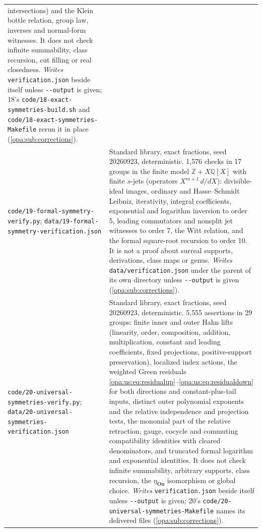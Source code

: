 \documentclass[11pt,oneside]{article}
\numberwithin{equation}{section}
\theoremstyle{definition}
\theoremstyle{remark}
\newcommand{\Q}{\mathbb Q}
\newcommand{\Z}{\mathbb Z}
\newcommand{\fn}[1]{\nolinkurl{#1}}
\newcommand{\On}{\mathbf{On}}
\begin{document}
\begin{center}
\begin{longtable}{>{\raggedright\arraybackslash}p{}>{\raggedright\arraybackslash}p{}}
intersections) and the Klein bottle relation, group law, inverses and normal-form witnesses. It does not check infinite
summability, class recursion, cut filling or real closedness. \emph{Writes} \fn{verification.json} beside itself unless
\fn{--output} is given; 18's \fn{code/18-exact-symmetries-build.sh} and \fn{code/18-exact-symmetries-Makefile} rerun it in place
(\cref{opa:sub:corrections}).\\
\fn{code/19-formal-symmetry-verify.py};
\fn{data/19-formal-symmetry-verification.json} & Standard library, exact fractions, seed 20260923, deterministic. 1{,}576 checks in
17 groups in the finite model $\Z+X\Q[X]$ with finite $s$-jets (operators $X^{m+1}\,d/dX$): divisible-ideal images, ordinary and
Hasse--Schmidt Leibniz, iterativity, integral coefficients, exponential and logarithm inversion to order 5, leading commutators
and nonsplit jet witnesses to order 7, the Witt relation, and the formal square-root recursion to order 10. It is not a proof about
surreal supports, derivations, class maps or genus. \emph{Writes} \fn{data/verification.json} under the parent of its own directory
unless \fn{--output} is given (\cref{opa:sub:corrections}).\\
\fn{code/20-universal-symmetries-verify.py};
\fn{data/20-universal-symmetries-verification.json} & Standard library, exact fractions, seed 20260923, deterministic. 5{,}555
assertions in 29 groups: finite inner and outer Hahn lifts (linearity, order, composition, addition, multiplication, constant and
leading coefficients, fixed projections, positive-support preservation), localized index actions, the weighted Green residuals
\eqref{opa:us:eq:residualup}--\eqref{opa:us:eq:residualdown} for both directions and constant-plus-tail inputs, distinct outer polynomial
exponents and the relative independence and projection tests, the monomial part of the relative retraction, gauge, cocycle and commuting
compatibility identities with cleared denominators, and truncated formal logarithm and exponential identities. It does not check infinite
summability, arbitrary supports, class recursion, the $\eta_\On$ isomorphism or global choice. \emph{Writes} \fn{verification.json} beside itself
unless \fn{--output} is given; 20's \fn{code/20-universal-symmetries-Makefile} names its delivered files (\cref{opa:sub:corrections}).\\
\bottomrule
\end{longtable}
\end{center}
\end{document}
